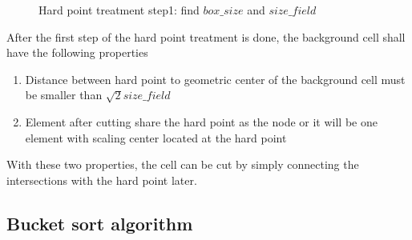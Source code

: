     \begin{figure}
        \centering
        \caption[Hard point treatment step 1]{Hard point treatment step1: find $box\_size$ and $size\_field$}
        \label{qdt_fig:qdt_hard_point_setp_1}
    \end{figure}
%
After the first step of the hard point treatment is done, the background cell shall have the following properties
    \begin{enumerate}
        \item Distance between hard point to geometric center of the background cell must be smaller than $\sqrt{2}size\_field$
        \item Element after cutting share the hard point as the node or it will be one element with scaling center located at the hard point
    \end{enumerate}
With these two properties, the cell can be cut by simply connecting the intersections with the hard point later.

\subsection{Bucket sort algorithm}
